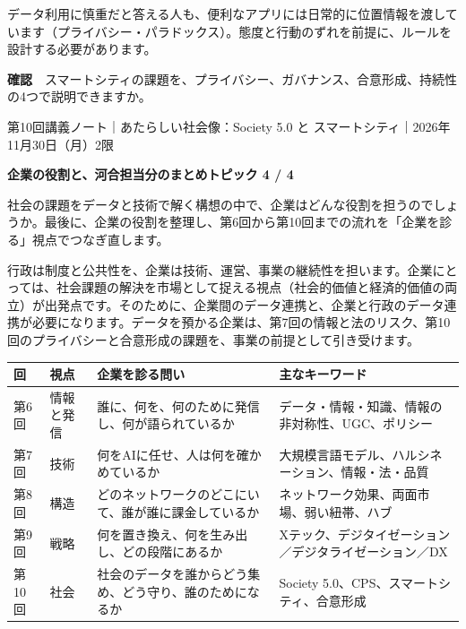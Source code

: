 \documentclass[paper=a4paper,fontsize=10pt,line_length=170mm,number_of_lines=46,baselineskip=1.6zw]{jlreq}
\newcommand\topichead[4]{%
  {\sffamily\footnotesize\color{grayt}#1\par}\vspace{1.5mm}
  {\sffamily\bfseries\LARGE #4}\hfill\colorbox{accent}{\sffamily\footnotesize\bfseries トピック #2 / #3}\par
  \vspace{1.2mm}{\color{ink}\hrule height 0.6pt}\vspace{3mm}}
\newcommand\subhead[1]{\par\vspace{2.6mm}{\sffamily\bfseries\large #1}\par\vspace{1.3mm}}
\begin{document}
データ利用に慎重だと答える人も、便利なアプリには日常的に位置情報を渡しています（プライバシー・パラドックス）。態度と行動のずれを前提に、ルールを設計する必要があります。\par\vspace{1.2mm}
\begin{checkbox}
{\sffamily\bfseries 確認}　スマートシティの課題を、プライバシー、ガバナンス、合意形成、持続性の4つで説明できますか。\par
\end{checkbox}
\clearpage
\topichead{第10回講義ノート｜あたらしい社会像：Society 5.0 と スマートシティ｜2026年11月30日（月）2限}{4}{4}{企業の役割と、河合担当分のまとめ}
社会の課題をデータと技術で解く構想の中で、企業はどんな役割を担うのでしょうか。最後に、企業の役割を整理し、第6回から第10回までの流れを「企業を診る」視点でつなぎ直します。\par\vspace{1.2mm}
\subhead{官民連携における企業の役割}
行政は制度と公共性を、企業は技術、運営、事業の継続性を担います。企業にとっては、社会課題の解決を市場として捉える視点（社会的価値と経済的価値の両立）が出発点です。そのために、企業間のデータ連携と、企業と行政のデータ連携が必要になります。データを預かる企業は、第7回の情報と法のリスク、第10回のプライバシーと合意形成の課題を、事業の前提として引き受けます。\par\vspace{1.2mm}
\subhead{5回のつながり}
\begin{center}\small\renewcommand{\arraystretch}{1.15}\setlength{\tabcolsep}{1.5mm}
\begin{tabular}{|p{24.0mm}|p{44.3mm}|p{44.3mm}|p{44.3mm}|}\arrayrulecolor{rulec}\hline
\rowcolor{papertwo}\sffamily\bfseries 回 & \sffamily\bfseries 視点 & \sffamily\bfseries 企業を診る問い & \sffamily\bfseries 主なキーワード\\\hline
第6回 & 情報と発信 & 誰に、何を、何のために発信し、何が語られているか & データ・情報・知識、情報の非対称性、UGC、ポリシー\\\hline
第7回 & 技術 & 何をAIに任せ、人は何を確かめているか & 大規模言語モデル、ハルシネーション、情報・法・品質\\\hline
第8回 & 構造 & どのネットワークのどこにいて、誰が誰に課金しているか & ネットワーク効果、両面市場、弱い紐帯、ハブ\\\hline
第9回 & 戦略 & 何を置き換え、何を生み出し、どの段階にあるか & Xテック、デジタイゼーション／デジタライゼーション／DX\\\hline
第10回 & 社会 & 社会のデータを誰からどう集め、どう守り、誰のためになるか & Society 5.0、CPS、スマートシティ、合意形成\\\hline
\end{tabular}\end{center}\vspace{0.5mm}
\end{document}
